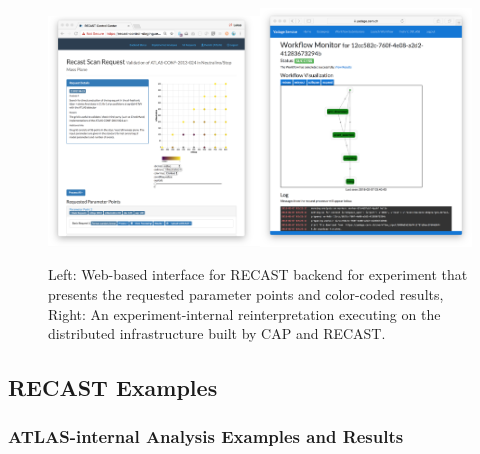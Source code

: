 \begin{figure}[h]
\begin{center}
\includegraphics[width=0.5\textwidth,angle=0]{ch5-figures/requestview.png}\includegraphics[width=0.5\textwidth,angle=0]{ch5-figures/monitor.png}

\end{center}
\caption{
Left: Web-based interface for RECAST backend for experiment that presents the requested parameter points and color-coded results,
Right: An experiment-internal reinterpretation executing on the distributed infrastructure built by CAP and RECAST.}
\label{fig:recast-cc}
\end{figure}

\subsection{RECAST Examples}

\subsubsection{ATLAS-internal Analysis Examples and Results}

